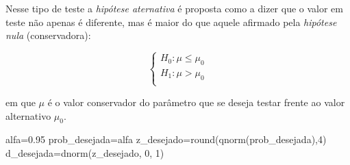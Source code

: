 \documentclass[
]{book}
\newenvironment{Shaded}{\begin{snugshade}}{\end{snugshade}}
\newcommand{\DecValTok}[1]{\textcolor[rgb]{0.00,0.00,0.81}{#1}}
\newcommand{\FloatTok}[1]{\textcolor[rgb]{0.00,0.00,0.81}{#1}}
\newcommand{\FunctionTok}[1]{\textcolor[rgb]{0.00,0.00,0.00}{#1}}
\newcommand{\NormalTok}[1]{#1}
\newcommand{\OtherTok}[1]{\textcolor[rgb]{0.56,0.35,0.01}{#1}}
\begin{document}
Nesse tipo de teste a \emph{hipótese aternativa} é proposta como a dizer que o valor em teste não apenas é diferente, mas é maior do que aquele afirmado pela \emph{hipótese nula} (conservadora):

\hfill\break

\[
\begin{cases}
    H_{0}: \mu \le \mu_{0}\\
    H_{1}: \mu > \mu_{0}\\
\end{cases}
\]

\hfill\break

em que \(\mu\) é o valor conservador do parâmetro que se deseja testar frente ao valor alternativo \(\mu_{0}\).

\hfill\break

\begin{Shaded}
\begin{Highlighting}[]
\NormalTok{alfa}\OtherTok{=}\FloatTok{0.95}
\NormalTok{prob\_desejada}\OtherTok{=}\NormalTok{alfa}
\NormalTok{z\_desejado}\OtherTok{=}\FunctionTok{round}\NormalTok{(}\FunctionTok{qnorm}\NormalTok{(prob\_desejada),}\DecValTok{4}\NormalTok{)}
\NormalTok{d\_desejada}\OtherTok{=}\FunctionTok{dnorm}\NormalTok{(z\_desejado, }\DecValTok{0}\NormalTok{, }\DecValTok{1}\NormalTok{)}





\end{Highlighting}
\end{Shaded}
\end{document}
